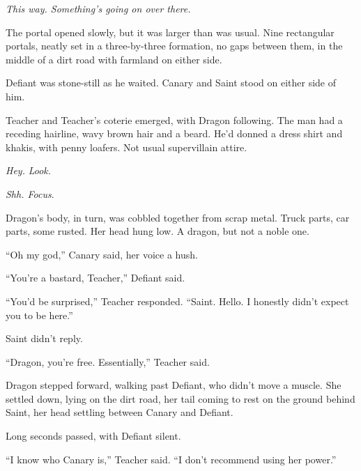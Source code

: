 \emph{This way.  Something's going on over there.}



\sectionbreak



The portal opened slowly, but it was larger than was usual.  Nine rectangular portals, neatly set in a three-by-three formation, no gaps between them, in the middle of a dirt road with farmland on either side.



Defiant was stone-still as he waited.  Canary and Saint stood on either side of him.



Teacher and Teacher's coterie emerged, with Dragon following.  The man had a receding hairline, wavy brown hair and a beard.  He'd donned a dress shirt and khakis, with penny loafers.  Not usual supervillain attire.



\emph{Hey. }\emph{Look}\emph{.}



\emph{Shh.  Focus}.



Dragon's body, in turn, was cobbled together from scrap metal.  Truck parts, car parts, some rusted.  Her head hung low.  A dragon, but not a noble one.



``Oh my god,'' Canary said, her voice a hush.



``You're a bastard, Teacher,'' Defiant said.



``You'd be surprised,'' Teacher responded.  ``Saint.  Hello.  I honestly didn't expect you to be here.''



Saint didn't reply.



``Dragon, you're free.  Essentially,'' Teacher said.



Dragon stepped forward, walking past Defiant, who didn't move a muscle.  She settled down, lying on the dirt road, her tail coming to rest on the ground behind Saint, her head settling between Canary and Defiant.



Long seconds passed, with Defiant silent.



``I know who Canary is,'' Teacher said.  ``I don't recommend using her power.''



